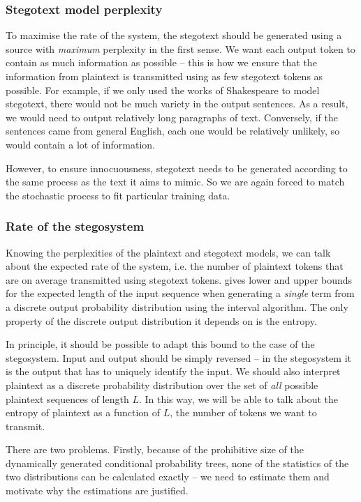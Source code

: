 \documentclass[draft]{IIBproject}
\makeatletter
\DeclareRobustCommand*{\ie}{i.e.\@\xspace}
\makeatother
\begin{document}
\subsubsection{Stegotext model perplexity}

To maximise the rate of the system, the stegotext should be generated using a source with \emph{maximum} perplexity in the first sense. We want each output token to contain as much information as possible -- this is how we ensure that the information from plaintext is transmitted using as few stegotext tokens as possible. For example, if we only used the works of Shakespeare to model stegotext, there would not be much variety in the output sentences. As a result, we would need to output relatively long paragraphs of text. Conversely, if the sentences came from general English, each one would be relatively unlikely, so would contain a lot of information.

However, to ensure innocuousness, stegotext needs to be generated according to the same process as the text it aims to mimic. So we are again forced to match the stochastic process to fit particular training data.

\subsubsection{Rate of the stegosystem}

Knowing the perplexities of the plaintext and stegotext models, we can talk about the expected rate of the system, \ie the number of plaintext tokens that are on average transmitted using stegotext tokens. \cite{hanhoshi1997} gives lower and upper bounds for the expected length of the input sequence when generating a \emph{single} term from a discrete output probability distribution using the interval algorithm. The only property of the discrete output distribution it depends on is the entropy.

In principle, it should be possible to adapt this bound to the case of the stegosystem. Input and output should be simply reversed -- in the stegosystem it is the output that has to uniquely identify the input. We should also interpret plaintext as a discrete probability distribution over the set of \emph{all} possible plaintext sequences of length $L$. In this way, we will be able to talk about the entropy of plaintext as a function of $L$, the number of tokens we want to transmit.

There are two problems. Firstly, because of the prohibitive size of the dynamically generated conditional probability trees, none of the statistics of the two distributions can be calculated exactly -- we need to estimate them and motivate why the estimations are justified.
\end{document}
